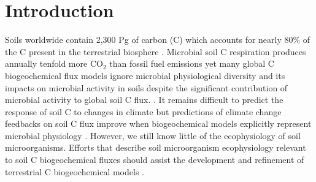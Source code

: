 \section{Introduction}
Soils worldwide contain 2,300 Pg of carbon (C) which accounts for nearly 80\%
of the C present in the terrestrial biosphere
\citep{Amundson_2001,BATJES_1996}. Microbial soil C respiration produces
annually tenfold more CO$_{2}$ than fossil fuel emissions
\citep{chapin2002principles} yet many global C biogeochemical flux models
ignore microbial physiological diversity and its impacts on microbial activity
in soils despite the significant contribution of microbial activity to global
soil C flux. \citep{Allison2010,Six2006,Treseder2011}. It remains difficult to
predict the response of soil C to changes in climate
\citep{Neff_2001,Davidson2006a,Todd-Brown2013} but predictions of climate
change feedbacks on soil C flux improve when biogeochemical models explicitly
represent microbial physiology \citep{Wieder2013}. However, we still know
little of the ecophysiology of soil microorganisms. Efforts that describe soil
microorganism ecophysiology relevant to soil C biogeochemical fluxes should
assist the development and refinement of terrestrial C biogeochemical models
\citep{Bradford2008,Neff_2001,McGuire2010}.

